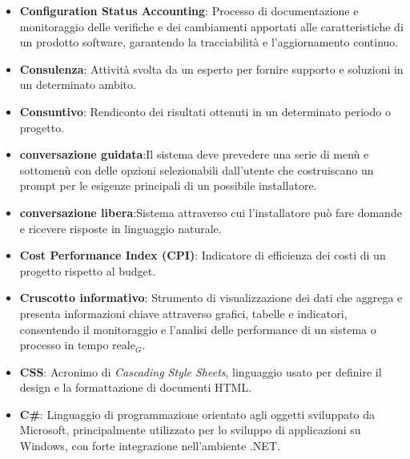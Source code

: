 \begin{itemize}
    \item \textbf{Configuration Status Accounting}: Processo di documentazione e monitoraggio delle verifiche e dei cambiamenti apportati alle caratteristiche di un prodotto software, garantendo la tracciabilità e l'aggiornamento continuo.
    \item \textbf{Consulenza}: Attività svolta da un esperto per fornire supporto e soluzioni in un determinato ambito.
    \item \textbf{Consuntivo}: Rendiconto dei risultati ottenuti in un determinato periodo o progetto.
    \item \textbf{conversazione guidata}:Il sistema deve prevedere una serie di menù e sottomenù con delle opzioni
    selezionabili dall’utente che costruiscano un prompt per le esigenze principali di un
    possibile installatore.
    \item \textbf{conversazione libera}:Sistema attraverso cui l’installatore può
    fare domande e ricevere risposte in linguaggio naturale.
    \item \textbf{Cost Performance Index (CPI)}: Indicatore di efficienza dei costi di un progetto rispetto al budget.
    \item \textbf{Cruscotto informativo}: Strumento di visualizzazione dei dati che aggrega e presenta informazioni chiave attraverso grafici, tabelle e indicatori, consentendo il monitoraggio e l'analisi delle performance di un sistema o processo in tempo reale$_G$.
    \item \textbf{CSS}: Acronimo di \textit{Cascading Style Sheets}, linguaggio usato per definire il design e la formattazione di documenti HTML.
    \item \textbf{C\#}: Linguaggio di programmazione orientato agli oggetti sviluppato da Microsoft, principalmente utilizzato per lo sviluppo di applicazioni su Windows, con forte integrazione nell'ambiente .NET.
    
\end{itemize}

